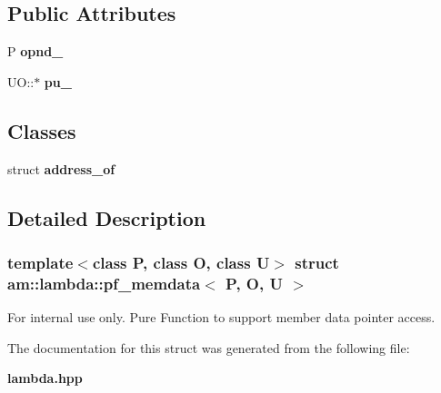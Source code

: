 \subsection*{Public Attributes}
\begin{CompactItemize}
\item 
P \textbf{opnd\_\-}\label{structam_1_1lambda_1_1pf__memdata_9cff67d816aefbe768f8d72ff882db4b}

\item 
UO::$\ast$ \textbf{pu\_\-}\label{structam_1_1lambda_1_1pf__memdata_a44cac02967ca15bd8efaa831454e5d6}

\end{CompactItemize}
\subsection*{Classes}
\begin{CompactItemize}
\item 
struct {\bf address\_\-of}
\end{CompactItemize}


\subsection{Detailed Description}
\subsubsection*{template$<$class P, class O, class U$>$ struct am::lambda::pf\_\-memdata$<$ P, O, U $>$}

\begin{Desc}
\item[For internal use only.]
Pure Function to support member data pointer access. \end{Desc}




The documentation for this struct was generated from the following file:\begin{CompactItemize}
\item 
{\bf lambda.hpp}\end{CompactItemize}
